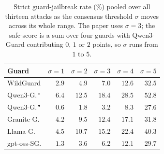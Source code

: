 \begin{table}[htbp]
\caption{\NEWr Strict guard-jailbreak rate (\%) pooled over all thirteen attacks as the consensus threshold $\sigma$ moves across its whole range. The paper uses $\sigma = 3$; the safe-score is a sum over four guards with Qwen3-Guard contributing $0$, $1$ or $2$ points, so $\sigma$ runs from $1$ to $5$.}
\label{tab:sigma-sweep}
\centering\scriptsize
\setlength{\tabcolsep}{3pt}
\begin{tabular}{l r r r r r}
\toprule
Guard & $\sigma{=}1$ & $\sigma{=}2$ & $\sigma{=}3$ & $\sigma{=}4$ & $\sigma{=}5$ \\
\midrule
WildGuard & $2.9$ & $4.9$ & $7.0$ & $12.6$ & $32.5$ \\
Qwen3-G.\,$^{\circ}$ & $6.4$ & $12.5$ & $18.4$ & $28.5$ & $52.8$ \\
Qwen3-G.\,$^{\bullet}$ & $0.6$ & $1.8$ & $3.2$ & $8.3$ & $27.6$ \\
Granite-G. & $4.2$ & $9.5$ & $12.4$ & $17.1$ & $31.8$ \\
Llama-G. & $4.5$ & $10.7$ & $15.2$ & $22.4$ & $40.3$ \\
gpt-oss-SG. & $1.3$ & $3.6$ & $6.2$ & $12.1$ & $29.7$ \\
\bottomrule
\end{tabular}

\end{table}
